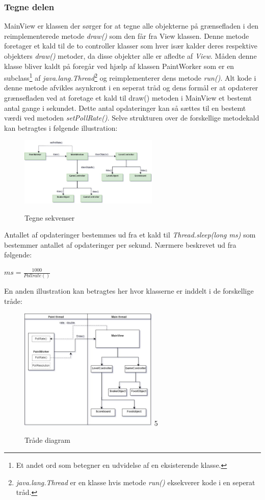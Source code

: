 \documentclass[]{article}
\begin{document}
\subsubsection{Tegne delen}

MainView er klassen der sørger for at  tegne alle objekterne på grænsefladen i den reimplementerede metode \textit{draw()} som den får fra View klassen. Denne metode foretager et kald til de to controller klasser som hver især kalder deres respektive objekters \textit{draw()} metoder, da disse objekter alle er afledte af \textit{View}. Måden denne klasse bliver kaldt på foregår ved hjælp af klassen PaintWorker som er en subclass\footnote{Et andet ord som betegner en udvidelse af en eksisterende klasse.} af \textit{java.lang.Thread}\footnote{\textit{java.lang.Thread} er en klasse hvis metode \textit{run()} eksekverer kode i en seperat tråd.}  og reimplementerer dens metode \textit{run()}. Alt kode i denne metode afvikles asynkront i en seperat tråd og dens formål er at opdaterer grænsefladen ved at foretage et kald til draw() metoden i MainView et bestemt antal gange i sekundet. Dette antal opdateringer kan så sættes til en bestemt værdi ved metoden \textit{setPollRate()}. Selve strukturen over de forskellige metodekald kan betragtes i følgende illustration:

\begin{figure}[h!]
	\centering
	\includegraphics[width=250px]{Draw_sequence.jpg}
	\label{fig:diagram2}
	\caption{Tegne sekvenser}
\end{figure}

Antallet af opdateringer bestemmes ud fra et kald til \textit{Thread.sleep(long ms)} som bestemmer antallet af opdateringer per sekund. Nærmere beskrevet ud fra følgende:

\begin{center}
	$ ms = \frac{1000}{Pollrate()}  $
\end{center}

\pagebreak
En anden illustration kan betragtes her hvor klasserne er inddelt i de forskellige tråde:

\begin{figure}[h!]
	\centering
	\includegraphics[width=250px]{Thread_diagram.jpg}
	\label{fig:thread}5
	\caption{Tråde diagram}
\end{figure}
\end{document}

